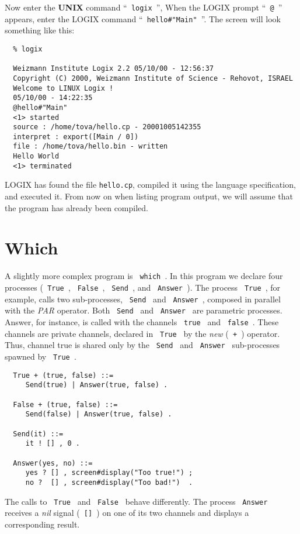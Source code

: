 Now enter the {\bf UNIX} command ``\verb+ logix +'',
When the LOGIX prompt ``\verb+ @ +'' appears,
enter the LOGIX command ``\verb+ hello#"Main" +''.  The screen will look
something like this:

\begin{verbatim}
  % logix

  Weizmann Institute Logix 2.2 05/10/00 - 12:56:37
  Copyright (C) 2000, Weizmann Institute of Science - Rehovot, ISRAEL
  Welcome to LINUX Logix !
  05/10/00 - 14:22:35
  @hello#"Main"
  <1> started
  source : /home/tova/hello.cp - 20001005142355
  interpret : export([Main / 0])
  file : /home/tova/hello.bin - written
  Hello World
  <1> terminated
\end{verbatim}

\noindent
LOGIX has found the file \verb+hello.cp+, compiled it using
the language specification, and executed it.  From now on when listing
program output, we will assume that the program has already been
compiled.

\section{Which}

A slightly more complex program is \verb+ which +. In this program we
declare four processes (\verb+ True +, \verb+ False +, \verb+ Send +, and
\verb+ Answer +).  The process \verb+ True +, for example, calls two
sub-processes, \verb+ Send + and \verb+ Answer +, composed in parallel
with the {\em PAR} operator.  Both \verb+ Send + and
\verb+ Answer + are parametric processes. Answer, for instance, is 
called with the channels \verb+ true + and \verb+ false +.  These
channels are private channels, declared in \verb+ True + by
the {\em new} (\verb- + -) operator. Thus, channel true is shared only
by the \verb+ Send + and \verb+ Answer + sub-processes spawned by
\verb+ True +.

\begin{verbatim}
  True + (true, false) ::=
     Send(true) | Answer(true, false) .

  False + (true, false) ::=
     Send(false) | Answer(true, false) .

  Send(it) ::=
     it ! [] , 0 .

  Answer(yes, no) ::=
     yes ? [] , screen#display("Too true!") ;
     no ?  [] , screen#display("Too bad!")  .
\end{verbatim}

The calls to \verb+ True + and \verb+ False + behave differently.
The process \verb+ Answer + receives a {\em nil} signal (\verb+ [] +) on one
of its two channels and displays a corresponding result.

